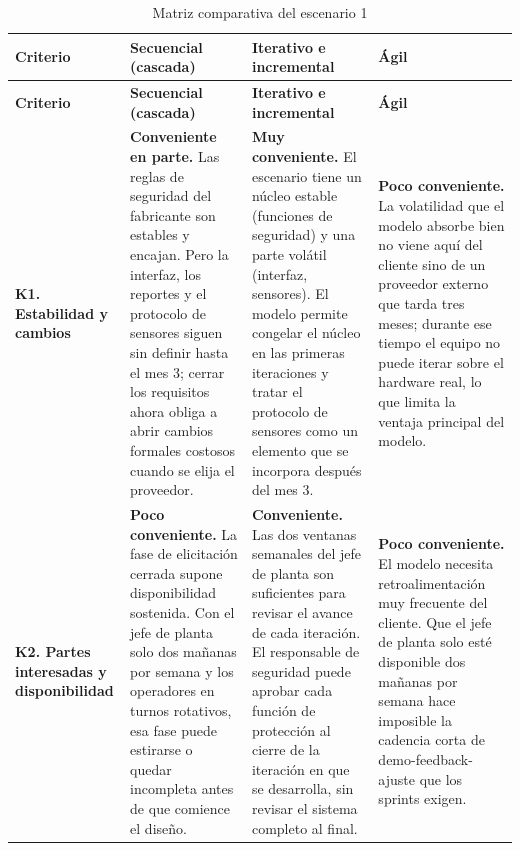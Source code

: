 \documentclass[12pt,a4paper]{article}
\begin{document}
\begingroup\footnotesize\setlength{\tabcolsep}{3pt}
\begin{longtable}{>{\raggedright\arraybackslash}p{2.0cm} >{\raggedright\arraybackslash}p{4.0cm} >{\raggedright\arraybackslash}p{4.0cm} >{\raggedright\arraybackslash}p{4.0cm}}
\caption{Matriz comparativa del escenario 1}\\
\toprule
\textbf{Criterio} & \textbf{Secuencial (cascada)} & \textbf{Iterativo e incremental} & \textbf{Ágil} \\
\midrule
\endfirsthead
\toprule
\textbf{Criterio} & \textbf{Secuencial (cascada)} & \textbf{Iterativo e incremental} & \textbf{Ágil} \\
\midrule
\endhead
\textbf{K1. Estabilidad y cambios} & \textbf{Conveniente en parte.} Las reglas de seguridad del fabricante son estables y encajan. Pero la interfaz, los reportes y el protocolo de sensores siguen sin definir hasta el mes 3; cerrar los requisitos ahora obliga a abrir cambios formales costosos cuando se elija el proveedor. & \textbf{Muy conveniente.} El escenario tiene un núcleo estable (funciones de seguridad) y una parte volátil (interfaz, sensores). El modelo permite congelar el núcleo en las primeras iteraciones y tratar el protocolo de sensores como un elemento que se incorpora después del mes 3. & \textbf{Poco conveniente.} La volatilidad que el modelo absorbe bien no viene aquí del cliente sino de un proveedor externo que tarda tres meses; durante ese tiempo el equipo no puede iterar sobre el hardware real, lo que limita la ventaja principal del modelo. \\ \midrule
\textbf{K2. Partes interesadas y disponibilidad} & \textbf{Poco conveniente.} La fase de elicitación cerrada supone disponibilidad sostenida. Con el jefe de planta solo dos mañanas por semana y los operadores en turnos rotativos, esa fase puede estirarse o quedar incompleta antes de que comience el diseño. & \textbf{Conveniente.} Las dos ventanas semanales del jefe de planta son suficientes para revisar el avance de cada iteración. El responsable de seguridad puede aprobar cada función de protección al cierre de la iteración en que se desarrolla, sin revisar el sistema completo al final. & \textbf{Poco conveniente.} El modelo necesita retroalimentación muy frecuente del cliente. Que el jefe de planta solo esté disponible dos mañanas por semana hace imposible la cadencia corta de demo-feedback-ajuste que los sprints exigen. \\ \midrule

\end{longtable}
\end{document}
